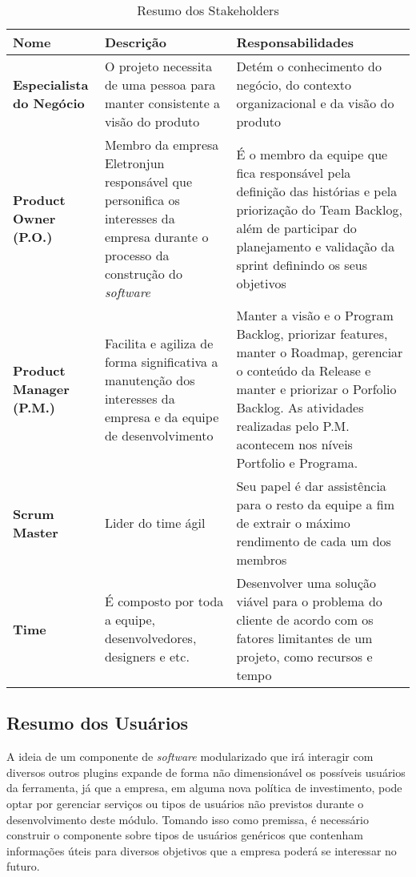       \begin{table}[!htbp]
        \centering
        \caption{Resumo dos Stakeholders}
        \label{Resumo dos Stakeholders}
        \begin{tabularx}{0.9\textwidth}{|s|s|t|}
          \hline
            \textbf{Nome}             &     \textbf{Descrição}     &   \textbf{Responsabilidades} \\ \hline
            \textbf{Especialista do Negócio}   & O projeto necessita de uma pessoa para manter consistente a visão do produto & Detém o conhecimento do negócio, do contexto organizacional e da visão do produto  \\ \hline
            \textbf{Product Owner (P.O.)}      & Membro da empresa Eletronjun responsável que personifica os interesses da empresa durante o processo da construção do \textit{software} & É o membro da equipe que fica responsável pela definição das histórias e pela priorização do Team Backlog, além de participar do planejamento e validação da sprint definindo os seus objetivos   \\ \hline
            \textbf{Product Manager (P.M.)}    & Facilita e agiliza de forma significativa a manutenção dos interesses da empresa e da equipe de desenvolvimento & Manter a visão e o Program Backlog, priorizar features, manter o Roadmap, gerenciar o conteúdo da Release e manter e priorizar o Porfolio Backlog. As atividades realizadas pelo P.M. acontecem nos níveis Portfolio e Programa. \\ \hline
            \textbf{Scrum Master}              & Lider do time ágil & Seu papel é dar assistência para o resto da equipe a fim de extrair o máximo rendimento de cada um dos membros  \\ \hline
            \textbf{Time}                      & É composto por toda a equipe, desenvolvedores, designers e etc. & Desenvolver uma solução viável para o problema do cliente de acordo com os fatores limitantes de um projeto, como recursos e tempo   \\ \hline
        \end{tabularx}
      \end{table}

    \subsection{Resumo dos Usuários} \label{res_usuarios}
A ideia de um componente de \textit{software} modularizado que irá interagir com diversos outros plugins expande de forma não dimensionável os possíveis usuários da ferramenta, já que a empresa, em alguma nova política de investimento, pode optar por gerenciar serviços ou tipos de usuários não previstos durante o desenvolvimento deste módulo. Tomando isso como premissa, é necessário construir o componente sobre tipos de usuários genéricos que contenham informações úteis para diversos objetivos que a empresa poderá se interessar no futuro.

